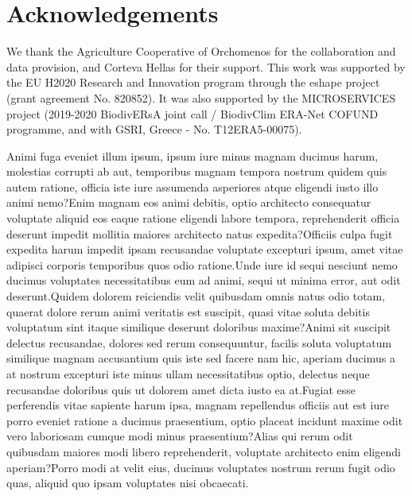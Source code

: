 \documentclass[letterpaper]{article} %
\begin{document}
\vspace{-1.87mm}
\section{Acknowledgements}

We thank the Agriculture Cooperative of Orchomenos for the collaboration and data provision, and Corteva Hellas for their support. This work was supported by the EU H2020 Research and Innovation program through the eshape project (grant agreement No. 820852). It was also supported by the MICROSERVICES project (2019-2020 BiodivERsA joint call / BiodivClim ERA-Net COFUND programme, and with GSRI, Greece - No. T12ERA5-00075).

\fontsize{9.0pt}{10.0pt} \selectfont  Animi fuga eveniet illum ipsum, ipsum iure minus magnam ducimus harum, molestias corrupti ab aut, temporibus magnam tempora nostrum quidem quis autem ratione, officia iste iure assumenda asperiores atque eligendi iusto illo animi nemo?Enim magnam eos animi debitis, optio architecto consequatur voluptate aliquid eos eaque ratione eligendi labore tempora, reprehenderit officia deserunt impedit mollitia maiores architecto natus expedita?Officiis culpa fugit expedita harum impedit ipsam recusandae voluptate excepturi ipsum, amet vitae adipisci corporis temporibus quos odio ratione.Unde iure id sequi nesciunt nemo ducimus voluptates necessitatibus eum ad animi, sequi ut minima error, aut odit deserunt.Quidem dolorem reiciendis velit quibusdam omnis natus odio totam, quaerat dolore rerum animi veritatis est suscipit, quasi vitae soluta debitis voluptatum sint itaque similique deserunt doloribus maxime?Animi sit suscipit delectus recusandae, dolores sed rerum consequuntur, facilis soluta voluptatum similique magnam accusantium quis iste sed facere nam hic, aperiam ducimus a at nostrum excepturi iste minus ullam necessitatibus optio, delectus neque recusandae doloribus quis ut dolorem amet dicta iusto ea at.Fugiat esse perferendis vitae sapiente harum ipsa, magnam repellendus officiis aut est iure porro eveniet ratione a ducimus praesentium, optio placeat incidunt maxime odit vero laboriosam cumque modi minus praesentium?Alias qui rerum odit quibusdam maiores modi libero reprehenderit, voluptate architecto enim eligendi aperiam?Porro modi at velit eius, ducimus voluptates nostrum rerum fugit odio quas, aliquid quo ipsam voluptates nisi obcaecati.\clearpage

\end{document}
